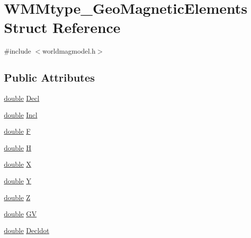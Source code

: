 \hypertarget{struct_w_m_mtype___geo_magnetic_elements}{\section{W\-M\-Mtype\-\_\-\-Geo\-Magnetic\-Elements Struct Reference}
\label{struct_w_m_mtype___geo_magnetic_elements}
}


{\ttfamily \#include $<$worldmagmodel.\-h$>$}

\subsection*{Public Attributes}
\begin{DoxyCompactItemize}
\item 
\hyperlink{_super_l_u_support_8h_a8956b2b9f49bf918deed98379d159ca7}{double} \hyperlink{struct_w_m_mtype___geo_magnetic_elements_a683f5cce0a61ae941ac21ac3245b590a}{Decl}
\item 
\hyperlink{_super_l_u_support_8h_a8956b2b9f49bf918deed98379d159ca7}{double} \hyperlink{struct_w_m_mtype___geo_magnetic_elements_a4a892ce94600018b364ef34e8416861c}{Incl}
\item 
\hyperlink{_super_l_u_support_8h_a8956b2b9f49bf918deed98379d159ca7}{double} \hyperlink{struct_w_m_mtype___geo_magnetic_elements_a4c99b8d3e3432fca01948041425f1123}{F}
\item 
\hyperlink{_super_l_u_support_8h_a8956b2b9f49bf918deed98379d159ca7}{double} \hyperlink{struct_w_m_mtype___geo_magnetic_elements_a0481f463d3ac0e7d7638edd1293955ed}{H}
\item 
\hyperlink{_super_l_u_support_8h_a8956b2b9f49bf918deed98379d159ca7}{double} \hyperlink{struct_w_m_mtype___geo_magnetic_elements_aa8c06cae11ef4891bf6d43eaeb7787d5}{X}
\item 
\hyperlink{_super_l_u_support_8h_a8956b2b9f49bf918deed98379d159ca7}{double} \hyperlink{struct_w_m_mtype___geo_magnetic_elements_a0b311ece921afc948e5e8dda01f7584a}{Y}
\item 
\hyperlink{_super_l_u_support_8h_a8956b2b9f49bf918deed98379d159ca7}{double} \hyperlink{struct_w_m_mtype___geo_magnetic_elements_a989cffa7f071bb16f17a2be007dd5419}{Z}
\item 
\hyperlink{_super_l_u_support_8h_a8956b2b9f49bf918deed98379d159ca7}{double} \hyperlink{struct_w_m_mtype___geo_magnetic_elements_a384032e354879712c50bee2ffef663c2}{G\-V}
\item 
\hyperlink{_super_l_u_support_8h_a8956b2b9f49bf918deed98379d159ca7}{double} \hyperlink{struct_w_m_mtype___geo_magnetic_elements_ac37defec32ce23551b0d787961d5e615}{Decldot}

\end{DoxyCompactItemize}
